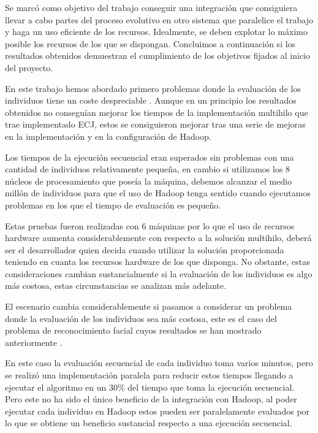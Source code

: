 Se marc\'o como objetivo del trabajo conseguir una integraci\'on que consiguiera llevar a cabo partes del proceso evolutivo en otro sistema que paralelice el trabajo y haga un uso eficiente de los recursos. Idealmente, se deben explotar lo m\'aximo posible los recursos de los que se dispongan. Concluimos a continuaci\'on si los resultados obtenidos demuestran el cumplimiento de los objetivos fijados al inicio del proyecto.

En este trabajo hemos abordado primero problemas donde la evaluaci\'on de los individuos tiene un coste despreciable . Aunque en un principio los resultados obtenidos no consegu\'ian mejorar los tiempos de la implementaci\'on multihilo que trae implementado ECJ, estos se consiguieron mejorar tras una serie de mejoras en la implementaci\'on y en la configuraci\'on de Hadoop.

Los tiempos de la ejecuci\'on secuencial eran superados sin problemas con una cantidad de individuos relativamente peque\~na, en cambio si utilizamos los 8 núcleos de procesamiento que poseía la m\'aquina, debemos alcanzar el medio mill\'on de individuos para que el uso de Hadoop tenga sentido cuando ejecutamos problemas en los que el tiempo de evaluaci\'on es peque\~no. 

Estas pruebas fueron realizadas con 6 m\'aquinas por lo que el uso de recursos hardware aumenta considerablemente con respecto a la soluci\'on multihilo, deber\'a ser el desarrollador quien decida cuando utilizar la soluci\'on proporcionada teniendo en cuanta los recursos hardware de los que disponga. No obstante, estas consideraciones cambian sustancialmente si la evaluaci\'on de los individuos es algo m\'as costosa, estas circunstancias se analizan m\'as adelante.


El escenario cambia considerablemente si pasamos a considerar un problema donde la evaluaci\'on de los individuos sea m\'as costosa, este es el caso del problema de reconocimiento facial cuyos resultados se han mostrado anteriormente . 

En este caso la evaluaci\'on secuencial de cada individuo toma varios minutos, pero se realiz\'o una implementaci\'on paralela para reducir estos tiempos llegando a ejecutar el algoritmo en un 30\% del tiempo que toma la ejecuci\'on secuencial. Pero este no ha sido el \'unico beneficio de la integraci\'on con Hadoop, al poder ejecutar cada individuo en Hadoop estos pueden ser paralelamente evaluados por lo que se obtiene un beneficio sustancial respecto a una ejecuci\'on secuencial. 

